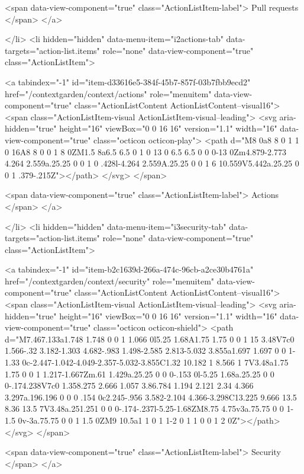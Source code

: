         <span data-view-component="true" class="ActionListItem-label">
          Pull requests
</span>      
</a>
  
</li>
        <li hidden="hidden" data-menu-item="i2actions-tab" data-targets="action-list.items" role="none" data-view-component="true" class="ActionListItem">
    
    
    <a tabindex="-1" id="item-d33616e5-384f-45b7-857f-03b7fbb9ecd2" href="/contextgarden/context/actions" role="menuitem" data-view-component="true" class="ActionListContent ActionListContent--visual16">
        <span class="ActionListItem-visual ActionListItem-visual--leading">
          <svg aria-hidden="true" height="16" viewBox="0 0 16 16" version="1.1" width="16" data-view-component="true" class="octicon octicon-play">
    <path d="M8 0a8 8 0 1 1 0 16A8 8 0 0 1 8 0ZM1.5 8a6.5 6.5 0 1 0 13 0 6.5 6.5 0 0 0-13 0Zm4.879-2.773 4.264 2.559a.25.25 0 0 1 0 .428l-4.264 2.559A.25.25 0 0 1 6 10.559V5.442a.25.25 0 0 1 .379-.215Z"></path>
</svg>
        </span>
      
        <span data-view-component="true" class="ActionListItem-label">
          Actions
</span>      
</a>
  
</li>
        <li hidden="hidden" data-menu-item="i3security-tab" data-targets="action-list.items" role="none" data-view-component="true" class="ActionListItem">
    
    
    <a tabindex="-1" id="item-b2c1639d-266a-474c-96cb-a2ce30b4761a" href="/contextgarden/context/security" role="menuitem" data-view-component="true" class="ActionListContent ActionListContent--visual16">
        <span class="ActionListItem-visual ActionListItem-visual--leading">
          <svg aria-hidden="true" height="16" viewBox="0 0 16 16" version="1.1" width="16" data-view-component="true" class="octicon octicon-shield">
    <path d="M7.467.133a1.748 1.748 0 0 1 1.066 0l5.25 1.68A1.75 1.75 0 0 1 15 3.48V7c0 1.566-.32 3.182-1.303 4.682-.983 1.498-2.585 2.813-5.032 3.855a1.697 1.697 0 0 1-1.33 0c-2.447-1.042-4.049-2.357-5.032-3.855C1.32 10.182 1 8.566 1 7V3.48a1.75 1.75 0 0 1 1.217-1.667Zm.61 1.429a.25.25 0 0 0-.153 0l-5.25 1.68a.25.25 0 0 0-.174.238V7c0 1.358.275 2.666 1.057 3.86.784 1.194 2.121 2.34 4.366 3.297a.196.196 0 0 0 .154 0c2.245-.956 3.582-2.104 4.366-3.298C13.225 9.666 13.5 8.36 13.5 7V3.48a.251.251 0 0 0-.174-.237l-5.25-1.68ZM8.75 4.75v3a.75.75 0 0 1-1.5 0v-3a.75.75 0 0 1 1.5 0ZM9 10.5a1 1 0 1 1-2 0 1 1 0 0 1 2 0Z"></path>
</svg>
        </span>
      
        <span data-view-component="true" class="ActionListItem-label">
          Security
</span>      
</a>
  
